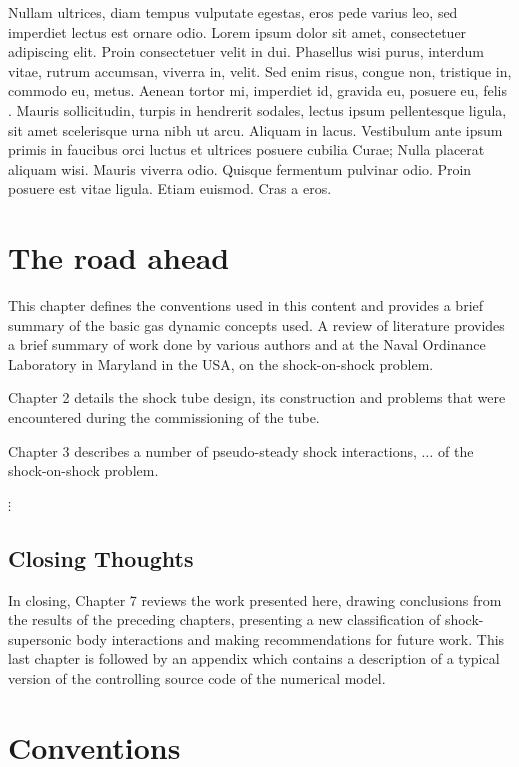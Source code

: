 Nullam ultrices, diam tempus vulputate egestas, eros pede varius leo, sed imperdiet lectus est ornare odio. Lorem ipsum dolor sit amet, consectetuer adipiscing elit. Proin consectetuer velit in dui. Phasellus wisi purus, interdum vitae, rutrum accumsan, viverra in, velit. Sed enim risus, congue non, tristique in, commodo eu, metus. Aenean tortor mi, imperdiet id, gravida eu, posuere eu, felis \cite{Knuth1968}. Mauris sollicitudin, turpis in hendrerit sodales, lectus ipsum pellentesque ligula, sit amet scelerisque urna nibh ut arcu. Aliquam in lacus. Vestibulum ante ipsum primis in faucibus orci luctus et ultrices posuere cubilia Curae; Nulla placerat aliquam wisi. Mauris viverra odio. Quisque fermentum pulvinar odio. Proin posuere est vitae ligula. Etiam euismod. Cras a eros.

\section{The road ahead}

This chapter defines the conventions used in this content and provides a brief summary of
the basic gas dynamic concepts used. A review of literature provides a brief summary of work
done by various authors and at the Naval Ordinance Laboratory in Maryland in the USA, on the
shock-on-shock problem.

Chapter 2 details the shock tube design, its construction and problems that were encountered
during the commissioning of the tube.

Chapter 3 describes a number of pseudo-steady shock interactions, $\ldots$ of the
shock-on-shock problem.

$\vdots$

\subsection{Closing Thoughts}\label{sec:closingthoughts}

In closing, Chapter 7 reviews the work presented here, drawing conclusions from the results of
the preceding chapters, presenting a new classification of shock-supersonic body interactions
and making recommendations for future work. This last chapter is followed by an appendix
which contains a description of a typical version of the controlling source code of the
numerical model.

\section{Conventions}\label{sec:conventions}

